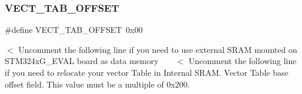 \mbox{\label{group___s_t_m32_f4xx___system___private___defines_ga40e1495541cbb4acbe3f1819bd87a9fe}} 
\subsubsection{\texorpdfstring{V\+E\+C\+T\+\_\+\+T\+A\+B\+\_\+\+O\+F\+F\+S\+ET}{VECT\_TAB\_OFFSET}}
{\footnotesize\ttfamily \#define V\+E\+C\+T\+\_\+\+T\+A\+B\+\_\+\+O\+F\+F\+S\+ET~0x00}

$<$ Uncomment the following line if you need to use external S\+R\+AM mounted on S\+T\+M324x\+G\+\_\+\+E\+V\+AL board as data memory ~\newline
~\newline
 $<$ Uncomment the following line if you need to relocate your vector Table in Internal S\+R\+AM. Vector Table base offset field. This value must be a multiple of 0x200. 